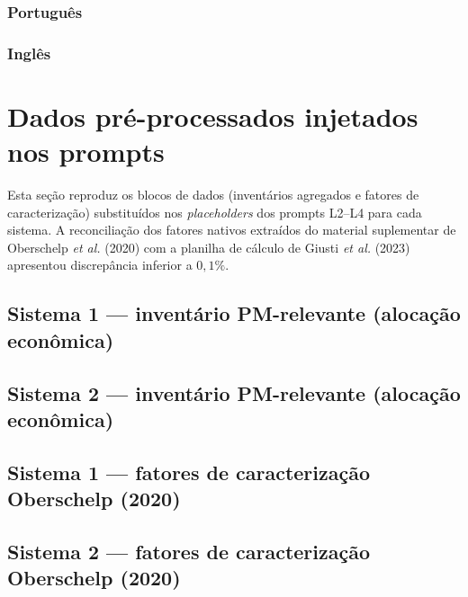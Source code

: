 \documentclass[12pt,a4paper]{article}
\begin{document}
\subsubsection{Português}

\subsubsection{Inglês}


\section{Dados pré-processados injetados nos prompts}

Esta seção reproduz os blocos de dados (inventários agregados e fatores de caracterização) substituídos nos \emph{placeholders} dos prompts L2--L4 para cada sistema. A reconciliação dos fatores nativos extraídos do material suplementar de Oberschelp \emph{et al.} (2020) com a planilha de cálculo de Giusti \emph{et al.} (2023) apresentou discrepância inferior a $0{,}1\%$.

\subsection{Sistema 1 --- inventário PM-relevante (alocação econômica)}


\subsection{Sistema 2 --- inventário PM-relevante (alocação econômica)}


\subsection{Sistema 1 --- fatores de caracterização Oberschelp (2020)}


\subsection{Sistema 2 --- fatores de caracterização Oberschelp (2020)}

\end{document}

